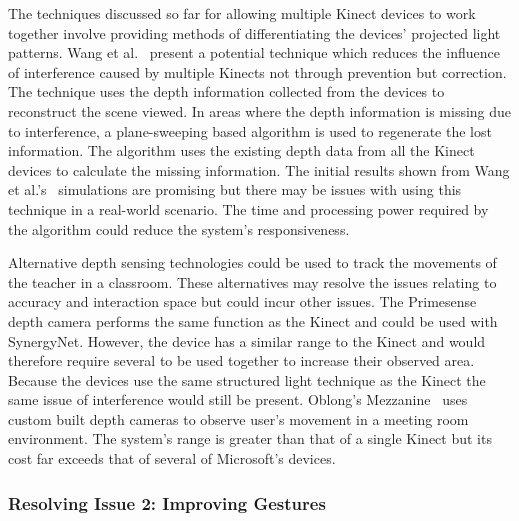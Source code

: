 \documentclass[link]{IWCOMP}
\begin{document}
The techniques discussed so far for allowing multiple Kinect devices to work together involve providing methods of differentiating the devices' projected light patterns.
Wang et al.~\cite{Wang2012} present a potential technique which reduces the influence of interference caused by multiple Kinects not through prevention but correction.
The technique uses the depth information collected from the devices to reconstruct the scene viewed.
In areas where the depth information is missing due to interference, a plane-sweeping based algorithm is used to regenerate the lost information.
The algorithm uses the existing depth data from all the Kinect devices to calculate the missing information.
The initial results shown from Wang et al.'s~\cite{Wang2012} simulations are promising but there may be issues with using this technique in a real-world scenario.
The time and processing power required by the algorithm could reduce the system's responsiveness.

Alternative depth sensing technologies could be used to track the movements of the teacher in a classroom.
These alternatives may resolve the issues relating to accuracy and interaction space but could incur other issues.
The Primesense~\cite{Wilson2010} depth camera performs the same function as the Kinect and could be used with SynergyNet.
However, the device has a similar range to the Kinect and would therefore require several to be used together to increase their observed area.
Because the devices use the same structured light technique as the Kinect the same issue of interference would still be present.
Oblong's Mezzanine~\cite{kramer2011} uses custom built depth cameras to observe user's movement in a meeting room environment.
The system's range is greater than that of a single Kinect but its cost far exceeds that of several of Microsoft's devices.

\subsubsection{Resolving Issue 2: Improving Gestures}
\label{subsubsec:studyPhase2ResolvingIssues2}
\end{document}
